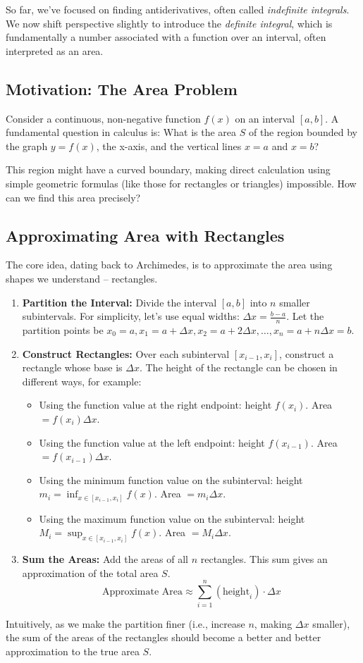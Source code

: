\documentclass[11pt]{article}
\theoremstyle{plain}
\theoremstyle{definition}
\theoremstyle{remark}
\begin{document}
So far, we've focused on finding antiderivatives, often called \emph{indefinite integrals}. We now shift perspective slightly to introduce the \emph{definite integral}, which is fundamentally a number associated with a function over an interval, often interpreted as an area.

\subsection{Motivation: The Area Problem}

Consider a continuous, non-negative function $f(x)$ on an interval $[a, b]$. A fundamental question in calculus is: What is the area $S$ of the region bounded by the graph $y=f(x)$, the x-axis, and the vertical lines $x=a$ and $x=b$?

This region might have a curved boundary, making direct calculation using simple geometric formulas (like those for rectangles or triangles) impossible. How can we find this area precisely?

\subsection{Approximating Area with Rectangles}

The core idea, dating back to Archimedes, is to approximate the area using shapes we understand – rectangles.
\begin{enumerate}
    \item \textbf{Partition the Interval:} Divide the interval $[a,b]$ into $n$ smaller subintervals. For simplicity, let's use equal widths: $\Delta x = \frac{b-a}{n}$. Let the partition points be $x_0=a, x_1=a+\Delta x, x_2=a+2\Delta x, \dots, x_n=a+n\Delta x=b$.
    \item \textbf{Construct Rectangles:} Over each subinterval $[x_{i-1}, x_i]$, construct a rectangle whose base is $\Delta x$. The height of the rectangle can be chosen in different ways, for example:
        \begin{itemize}
            \item Using the function value at the right endpoint: height $f(x_i)$. Area $= f(x_i)\Delta x$.
            \item Using the function value at the left endpoint: height $f(x_{i-1})$. Area $= f(x_{i-1})\Delta x$.
            \item Using the minimum function value on the subinterval: height $m_i = \inf_{x \in [x_{i-1}, x_i]} f(x)$. Area $= m_i \Delta x$.
            \item Using the maximum function value on the subinterval: height $M_i = \sup_{x \in [x_{i-1}, x_i]} f(x)$. Area $= M_i \Delta x$.
        \end{itemize}
    \item \textbf{Sum the Areas:} Add the areas of all $n$ rectangles. This sum gives an approximation of the total area $S$.
    \[ \text{Approximate Area} \approx \sum_{i=1}^n (\text{height}_i) \cdot \Delta x \]
\end{enumerate}
Intuitively, as we make the partition finer (i.e., increase $n$, making $\Delta x$ smaller), the sum of the areas of the rectangles should become a better and better approximation to the true area $S$.
\end{document}
